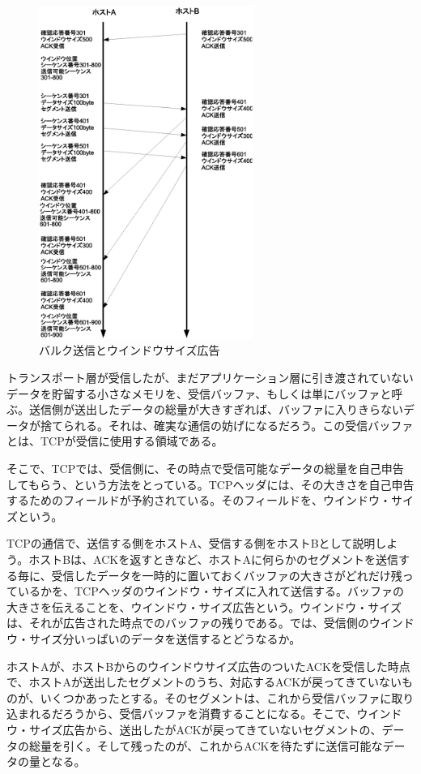 \begin{figure}
	\includegraphics[width=7cm, clip]{draw/tcp07n.eps}
	\caption{バルク送信とウインドウサイズ広告}
	\label{fig:tcp07}
\end{figure}

トランスポート層が受信したが、まだアプリケーション層に引き渡されていないデータを貯留する小さなメモリを、受信バッファ、もしくは単にバッファと呼ぶ。送信側が送出したデータの総量が大きすぎれば、バッファに入りきらないデータが捨てられる。それは、確実な通信の妨げになるだろう。この受信バッファとは、TCPが受信に使用する領域である。

そこで、TCPでは、受信側に、その時点で受信可能なデータの総量を自己申告してもらう、という方法をとっている。TCPヘッダには、その大きさを自己申告するためのフィールドが予約されている。そのフィールドを、ウインドウ・サイズという。

TCPの通信で、送信する側をホストA、受信する側をホストBとして説明しよう。ホストBは、ACKを返すときなど、ホストAに何らかのセグメントを送信する毎に、受信したデータを一時的に置いておくバッファの大きさがどれだけ残っているかを、TCPヘッダのウインドウ・サイズに入れて送信する。バッファの大きさを伝えることを、ウインドウ・サイズ広告という。ウインドウ・サイズは、それが広告された時点でのバッファの残りである。では、受信側のウインドウ・サイズ分いっぱいのデータを送信するとどうなるか。



ホストAが、ホストBからのウインドウサイズ広告のついたACKを受信した時点で、ホストAが送出したセグメントのうち、対応するACKが戻ってきていないものが、いくつかあったとする。そのセグメントは、これから受信バッファに取り込まれるだろうから、受信バッファを消費することになる。そこで、ウインドウ・サイズ広告から、送出したがACKが戻ってきていないセグメントの、データの総量を引く。そして残ったのが、これからACKを待たずに送信可能なデータの量となる。

